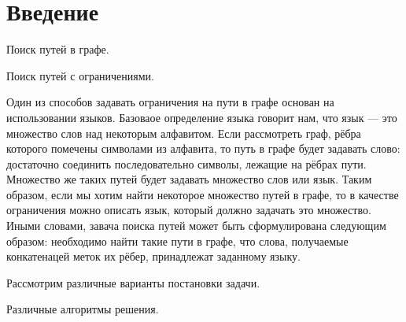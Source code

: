\section{Введение}

Поиск путей в графе.

Поиск путей с ограничениями.

Один из способов задавать ограничения на пути в графе основан на использовании языков.
Базоваое определение языка говорит нам, что язык --- это множество слов над некоторым алфавитом.
Если рассмотреть граф, рёбра которого помечены символами из алфавита, то путь в графе будет задавать слово: достаточно соединить последовательно символы, лежащие на рёбрах пути.
Множество же таких путей будет задавать множество слов или язык.
Таким образом, если мы хотим найти некоторое множество путей в графе, то в качестве ограничения можно описать язык, который должно задачать это множество.
Иными словами, завача поиска путей может быть сформулирована следующим образом: необходимо найти такие пути в графе, что слова, получаемые конкатенацей меток их рёбер, принадлежат заданному языку.

Рассмотрим различные варианты постановки задачи.

Различные алгоритмы решения.
